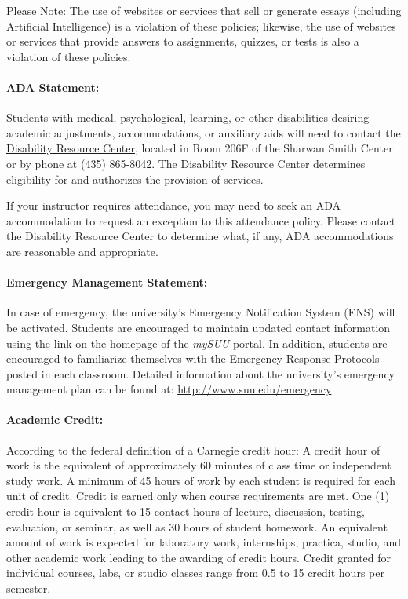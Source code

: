 \documentclass[12pt, letterpaper]{article}
\begin{document}
\noindent
\underline{Please Note}: The use of websites or services that sell or generate essays (including Artificial Intelligence) is a violation of these policies; likewise, the use of websites or services that provide answers to assignments, quizzes, or tests is also a violation of these policies.

\paragraph{ADA Statement:}
Students with medical, psychological, learning, or other disabilities desiring academic adjustments, accommodations, or auxiliary aids will need to contact the \href{https://www.suu.edu/disabilityservices/}{Disability Resource Center}, located in Room 206F of the Sharwan Smith Center or by phone at (435) 865-8042. The Disability Resource Center determines eligibility for and authorizes the provision of services.

\noindent
If your instructor requires attendance, you may need to seek an ADA accommodation to request an exception to this attendance policy. Please contact the Disability Resource Center to determine what, if any, ADA accommodations are reasonable and appropriate.

\paragraph{Emergency Management Statement:}
In case of emergency, the university's Emergency Notification System (ENS) will be activated. Students are encouraged to maintain updated contact information using the link on the homepage of the \emph{mySUU} portal. In addition, students are encouraged to familiarize themselves with the Emergency Response Protocols posted in each classroom. Detailed information about the university's emergency management plan can be found at: \href{http://www.suu.edu/emergency}{http://www.suu.edu/emergency}

\paragraph{Academic Credit:}
According to the federal definition of a Carnegie credit hour: A credit hour of work is the equivalent of approximately 60 minutes of class time or independent study work. A minimum of 45 hours of work by each student is required for each unit of credit. Credit is earned only when course requirements are met. One (1) credit hour is equivalent to 15 contact hours of lecture, discussion, testing, evaluation, or seminar, as well as 30 hours of student homework. An equivalent amount of work is expected for laboratory work, internships, practica, studio, and other academic work leading to the awarding of credit hours. Credit granted for individual courses, labs, or studio classes range from 0.5 to 15 credit hours per semester.
\end{document}
